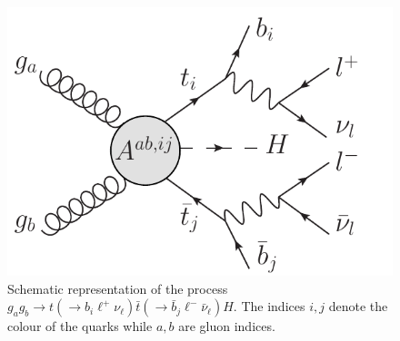 \documentclass[aps,preprint,tightenlines,floatfix,superscriptaddress,nofootinbib,showpacs]{revtex4-1}
\def\tbar{\bar{t}}
\def\bbar{\bar{b}}
\def\nubar{{\bar{\nu}}_{\ell}}
\begin{document}
\begin{center}
\begin{figure}[H]
\centering
\includegraphics[scale=0.6]{esquematico_II.pdf}
\vspace*{0.02\textwidth}
\caption{Schematic representation of the process $g_ag_b\to t(\to
  b_i{\ell}^+\nu_{\ell})\tbar(\to \bbar_j {\ell}^- \nubar) H$. The
  indices $i,j$ denote the colour of the quarks while $a,b$ are gluon
  indices.}
\label{fig2}
\end{figure}
\end{center}
\end{document}
